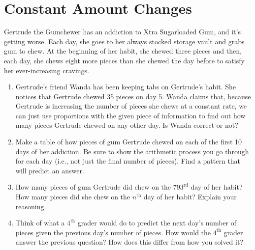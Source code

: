 \newpage
\section{Constant Amount Changes}\label{A:ConstantAmount}

\begin{prob}\label{P:gtg1}
Gertrude the Gumchewer has an addiction to Xtra Sugarloaded Gum, and it's getting worse.  Each day, she goes to her always stocked storage vault and grabs gum to chew.  At the beginning of her habit, she chewed three pieces and then, each day, she chews eight more pieces than she chewed the day before to satisfy her ever-increasing cravings.
\begin{enumerate}
\item Gertrude's friend Wanda has been keeping tabs on Gertrude's habit.  She notices that Gertrude chewed 35 pieces on day 5.  Wanda claims that, because Gertrude is increasing the number of pieces she chews at a constant rate, we can just use proportions with the given piece of information to find out how many pieces Gertrude chewed on any other day.  Is Wanda correct or not?

\item Make a table of how pieces of gum Gertrude chewed on each of the first 10 days of her addiction.  Be sure to show the arithmetic process you go through for each day (i.e., not just the final number of pieces).  Find a pattern that will predict an answer.  

\item How many pieces of gum Gertrude did chew on the $793^\mathrm{rd}$ day of her habit?  How many pieces did she chew on the $n^\mathrm{th}$ day of her habit?  Explain your reasoning.  

\item Think of what a $4^\mathrm{th}$ grader would do to predict the next day's number of pieces given the previous day's number of pieces.  How would the $4^\mathrm{th}$ grader answer the previous question?  How does this differ from how you solved it?


\end{enumerate}
\end{prob}
